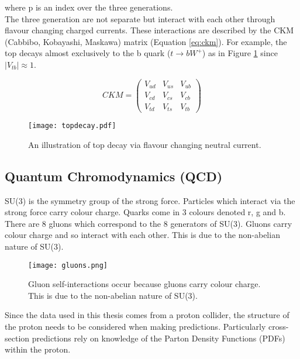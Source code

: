 where p is an index over the three generations. \\

The three generation are not separate but interact with each other through
flavour changing charged currents. These interactions are described by the CKM 
(Cabbibo, Kobayashi, Maskawa) matrix (Equation \ref{eq:ckm}). For example, the 
top decays almost exclusively to the b quark ($t\rightarrow bW^{+}$) as in 
Figure \ref{fig:topdecay} since $|V_{tb}| \approx 1$.

\begin{equation}
CKM = \left( 
\begin{array}{ccc}
V_{ud} & V_{us} & V_{ub} \\
V_{cd} & V_{cs} & V_{cb} \\
V_{td} & V_{ts} & V_{tb} 
\end{array} 
\right) 
\label{eq:ckm}
\end{equation}

\begin{figure}
\begin{center}
\texttt{[image: topdecay.pdf]}
\end{center}
\caption{An illustration of top decay via flavour changing neutral current.}
\label{fig:topdecay}
\end{figure}

\subsection{Quantum Chromodynamics (QCD)}

SU(3) is the symmetry group of the strong force. Particles which interact via
the strong force carry colour charge. Quarks come in 3 colours denoted r, g and 
b. There are 8 gluons which correspond to the 8 generators of SU(3). Gluons 
carry colour charge and so interact with each other. This is due to the 
non-abelian nature of SU(3). \\

\begin{figure}
\begin{center}
\texttt{[image: gluons.png]}
\end{center}
\caption{Gluon self-interactions occur because gluons carry colour charge. This
is due to the non-abelian nature of SU(3).}
\end{figure}

Since the data used in this thesis comes from a proton collider, the structure
of the proton needs to be considered when making predictions. Particularly
cross-section predictions rely on knowledge of the Parton Density Functions
(PDFs) within the proton. \\

